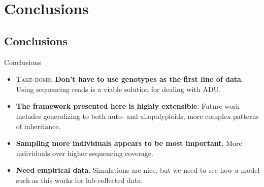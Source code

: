 \documentclass[presentation,sansserif]{beamer}
\begin{document}
\section{Conclusions}

\subsection*{Conclusions}

\begin{frame}[t]{Conclusions}
	\fontsize{10pt}{10}\selectfont
	\begin{itemize}
		\item \textsc{Take home}: \textbf{Don't have to use genotypes as the first line of data}. Using sequencing reads is a viable solution for dealing with ADU.
		\vspace{0.2in}

		\item \textbf{The framework presented here is highly extensible}. Future work includes generalizing to both auto- and allopolyploids, more complex patterns of inheritance.
		\vspace{0.2in}

		\item \textbf{Sampling more individuals appears to be most important}. More individuals over higher sequencing coverage.
		\vspace{0.2in}

		\item \textbf{Need empirical data}. Simulations are nice, but we need to see how a model such as this works for lab-collected data.

	\end{itemize}

\end{frame}

\section*{}
\end{document}
